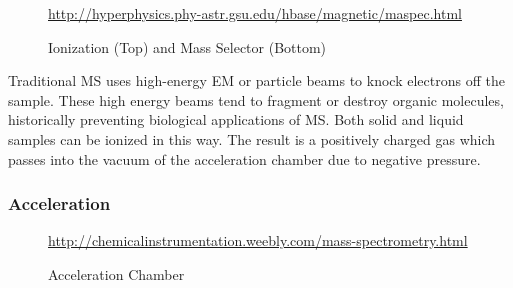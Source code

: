 \documentclass[letterpaper, 10 pt, conference]{ieeeconf}  %
\begin{document}
         \begin{figure}[h]
            \centering
            

            \caption{Ionization (Top) and Mass Selector (Bottom)}
            \tiny{\url{http://hyperphysics.phy-astr.gsu.edu/hbase/magnetic/maspec.html}}

        \end{figure}

        Traditional MS uses high-energy EM or particle beams to knock electrons off the sample. These high energy beams tend to fragment or destroy organic molecules, historically preventing biological applications of MS. Both solid and liquid samples can be ionized in this way. The result is a positively charged gas which passes into the vacuum of the acceleration chamber due to negative pressure.
        \FloatBarrier  

        \subsubsection{\textbf{Acceleration}}\hfill
            
            \begin{figure}[h]
                \centering
                \caption{Acceleration Chamber}
                \tiny{\url{http://chemicalinstrumentation.weebly.com/mass-spectrometry.html}}
            \end{figure}
\end{document}
